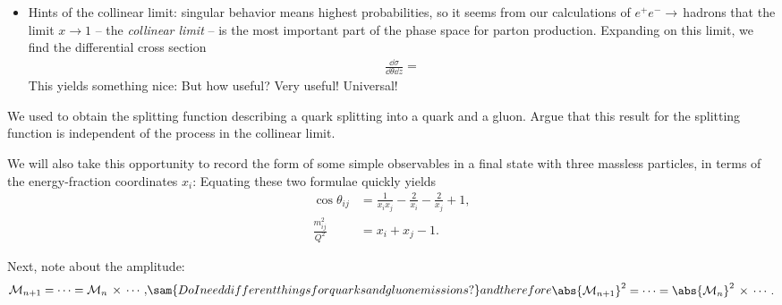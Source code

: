 \begin{itemize}
    \item
Hints of the collinear limit:
%
singular behavior means highest probabilities, so it seems from our calculations of \(e^+ e^- \to\,\)hadrons that the limit \(x \to 1\) -- the \textit{collinear limit} -- is the most important part of the phase space for parton production.
%
Expanding on this limit, we find the differential cross section
\begin{align}
    \frac{\dd\sigma}{\dd \theta \dd z}
    =
\end{align}
This yields something nice:
%
%
But how useful?
%
Very useful! Universal!
\end{itemize}


\begin{example}{}
    We used  to obtain the splitting function describing a quark splitting into a quark and a gluon.
    Argue that this result for the splitting function is independent of the process in the collinear limit.
\end{example}


We will also take this opportunity to record the form of some simple observables in a final state with three massless particles, in terms of the energy-fraction coordinates \(x_i\):
%
Equating these two formulae quickly yields
\begin{subequations}
    \label{eq:ee_kinematics}
    \begin{align}
        \cos\theta_{ij} &= \frac{1}{x_i x_j} - \frac{2}{x_i} - \frac{2}{x_j} + 1
        ,
        \\
        \frac{m^2_{ij}}{Q^2} &= x_i + x_j - 1
        .
    \end{align}
\end{subequations}


Next, note about the amplitude:
\begin{subequations}
\begin{align}
    \mathcal{M}_{n+1}
    =
    \cdots
    =
    \mathcal{M}_n
    \,
    \times
    \,
    \cdots
    \,,
\end{align}
\sam{Do I need different things for quarks and gluon emissions?}
and therefore
\begin{align}
    \abs{\mathcal{M}_{n+1}}^2
    =
    \cdots
    =
    \abs{\mathcal{M}_n}^2
    \,
    \times
    \,
    \cdots
    \,.
\end{align}
\end{subequations}

